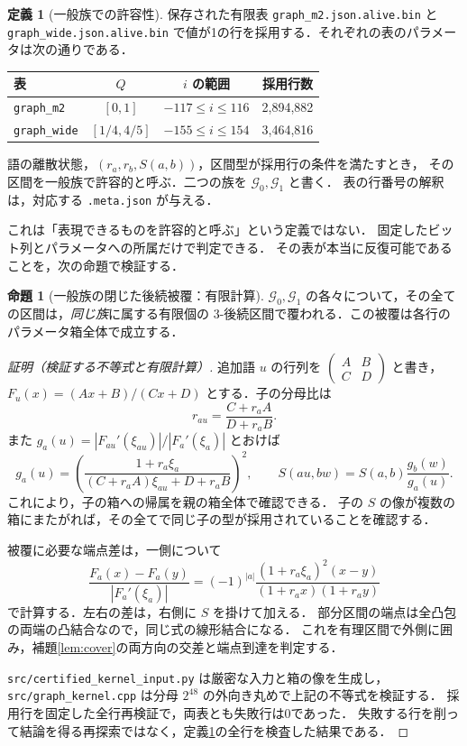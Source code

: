 \documentclass[10pt,a4paper]{article}
\theoremstyle{definition}
\newtheorem{definition}{定義}
\newtheorem{proposition}{命題}
\newcommand{\file}[1]{{\small\nolinkurl{#1}}}
\newcommand{\G}{\mathcal G}
\begin{document}
\begin{definition}[一般族での許容性]\label{def:general}
保存された有限表 \file{graph_m2.json.alive.bin} と \file{graph_wide.json.alive.bin}
で値が1の行を採用する．それぞれの表のパラメータは次の通りである．
\begin{center}\small
\begin{tabular}{lccc}
\toprule
表 & $Q$ & $i$ の範囲 & 採用行数\\\midrule
\texttt{graph\_m2} & $[0,1]$ & $-117\le i\le116$ & 2,894,882\\
\texttt{graph\_wide} & $[1/4,4/5]$ & $-155\le i\le154$ & 3,464,816\\\bottomrule
\end{tabular}
\end{center}
語の離散状態，$(r_a,r_b,S(a,b))$，区間型が採用行の条件を満たすとき，
その区間を一般族で許容的と呼ぶ．二つの族を $\G_0,\G_1$ と書く．
表の行番号の解釈は，対応する \file{.meta.json} が与える．
\end{definition}

これは「表現できるものを許容的と呼ぶ」という定義ではない．
固定したビット列とパラメータへの所属だけで判定できる．
その表が本当に反復可能であることを，次の命題で検証する．

\begin{proposition}[一般族の閉じた後続被覆：有限計算]\label{prop:general}
$\G_0,\G_1$ の各々について，その全ての区間は，\emph{同じ族}に属する有限個の
$3$-後続区間で覆われる．この被覆は各行のパラメータ箱全体で成立する．
\end{proposition}
\begin{proof}[証明（検証する不等式と有限計算）]
追加語 $u$ の行列を $\left(\begin{smallmatrix}A&B\\C&D\end{smallmatrix}\right)$ と書き，
$F_u(x)=(Ax+B)/(Cx+D)$ とする．子の分母比は
\[
 r_{au}=\frac{C+r_aA}{D+r_aB}.
\]
また $g_a(u)=|F_{au}'(\xi_{au})|/|F_a'(\xi_a)|$ とおけば
\[
 g_a(u)=\left(\frac{1+r_a\xi_a}
 {(C+r_aA)\xi_{au}+D+r_aB}\right)^2,
 \qquad S(au,bw)=S(a,b)\frac{g_b(w)}{g_a(u)}.
\]
これにより，子の箱への帰属を親の箱全体で確認できる．
子の $S$ の像が複数の箱にまたがれば，その全てで同じ子の型が採用されていることを確認する．

被覆に必要な端点差は，一側について
\[
 \frac{F_a(x)-F_a(y)}{|F_a'(\xi_a)|}
 =(-1)^{|a|}\frac{(1+r_a\xi_a)^2(x-y)}{(1+r_ax)(1+r_ay)}
\]
で計算する．左右の差は，右側に $S$ を掛けて加える．
部分区間の端点は全凸包の両端の凸結合なので，同じ式の線形結合になる．
これを有理区間で外側に囲み，補題\ref{lem:cover}の両方向の交差と端点到達を判定する．

\file{src/certified_kernel_input.py} は厳密な入力と箱の像を生成し，
\file{src/graph_kernel.cpp} は分母 $2^{48}$ の外向き丸めで上記の不等式を検証する．
採用行を固定した全行再検証で，両表とも失敗行は0であった．
失敗する行を削って結論を得る再探索ではなく，定義\ref{def:general}の全行を検査した結果である．
\end{proof}
\end{document}
